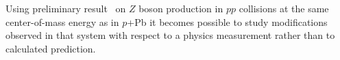 \documentclass[3p,times,twocolumn]{elsarticle}
\newcommand*{\pPb}{\ensuremath{p}+Pb\xspace}
\newcommand*{\Zboson}{\ensuremath{Z}\xspace}
\newcommand*{\Wboson}{\ensuremath{W}\xspace}
\newcommand*{\pp}{\ensuremath{pp}\xspace}
\newcommand*{\Zmm}{\ensuremath{Z\rightarrow\mu\mu}\xspace}
\newcommand*{\sqn}{\ensuremath{\sqrt{s_{_{\mathrm{NN}}}}}\xspace}
\newcommand*{\sqs}{\ensuremath{\sqrt{s}}\xspace}
\newcommand*{\TeV}{\mbox{TeV}\xspace}
\newcommand*{\RpPb}{\ensuremath{R_{p\mathrm{Pb}}}\xspace}
\begin{document}
Using preliminary result~\cite{me:2016} on \Zboson boson production in \pp collisions at the same center-of-mass energy as in \pPb it becomes possible to study modifications observed in that system with respect to a physics measurement rather than to calculated prediction. \par





\end{document}
